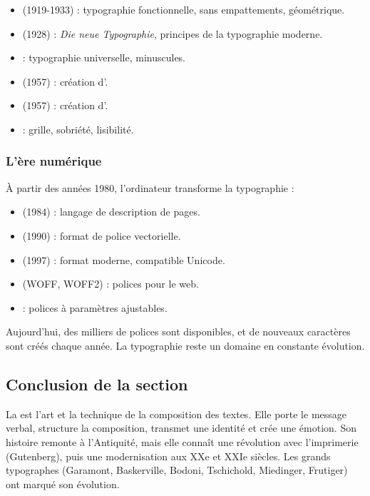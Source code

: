 \begin{itemize}
    \item {} (1919-1933) : typographie fonctionnelle, sans empattements, géométrique.
    \item {} (1928) : \emph{Die neue Typographie}, principes de la typographie moderne.
    \item {} : typographie universelle, minuscules.
    \item {} (1957) : création d'.
    \item {} (1957) : création d'.
    \item {} : grille, sobriété, lisibilité.
\end{itemize}

\subsubsection{L'ère numérique}

À partir des années 1980, l'ordinateur transforme la typographie :

\begin{itemize}
    \item {} (1984) : langage de description de pages.
    \item {} (1990) : format de police vectorielle.
    \item {} (1997) : format moderne, compatible Unicode.
    \item {} (WOFF, WOFF2) : polices pour le web.
    \item {} : polices à paramètres ajustables.
\end{itemize}

Aujourd'hui, des milliers de polices sont disponibles, et de nouveaux caractères sont créés chaque année. La typographie reste un domaine en constante évolution.

\subsection*{Conclusion de la section}

\begin{retenir}
La  est l'art et la technique de la composition des textes. Elle porte le message verbal, structure la composition, transmet une identité et crée une émotion. Son histoire remonte à l'Antiquité, mais elle connaît une révolution avec l'imprimerie (Gutenberg), puis une modernisation aux XXe et XXIe siècles. Les grands typographes (Garamont, Baskerville, Bodoni, Tschichold, Miedinger, Frutiger) ont marqué son évolution.
\end{retenir}

